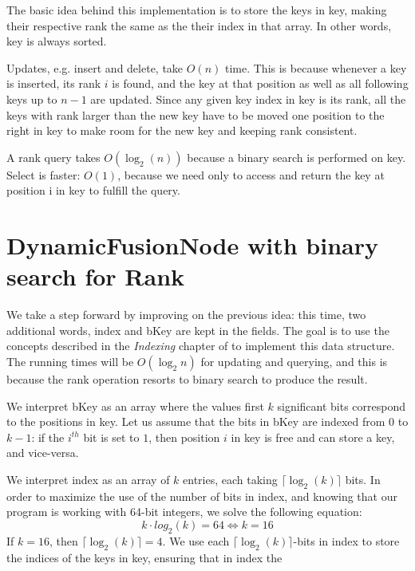 The basic idea behind this implementation is to store the keys in {\ttfamily key}, making their respective rank the same as the their index in that array. In other words, {\ttfamily key} is always sorted.

Updates, e.g. insert and delete, take $O(n)$ time. This is because whenever a key is inserted, its rank $i$ is found, and the key at that position as well as all following keys up to $n-1$ are updated. Since any given key index in {\ttfamily key} is its rank, all the keys with rank larger than the new key have to be moved one position to the right in {\ttfamily key} to make room for the new key and keeping rank consistent.

A rank query takes $O(\log_2(n))$ because a binary search is performed on {\ttfamily key}. Select is faster: $O(1)$, because we need only to access and return the key at position {\ttfamily i} in {\ttfamily key} to fulfill the query.

\section{DynamicFusionNode with binary search for Rank}
We take a step forward by improving on the previous idea: this time, two additional words, {\ttfamily index} and {\ttfamily bKey} are kept in the fields. The goal is to use the concepts described in the \textit{Indexing} chapter of \cite{patrascu2014dynamic} to implement this data structure. The running times will be $O(\log_2 n)$ for updating and querying, and this is because the {\ttfamily rank} operation resorts to binary search to produce the result.

We interpret {\ttfamily bKey} as an array where the values first $k$ significant bits correspond to the positions in {\ttfamily key}. Let us assume that the bits in {\ttfamily bKey} are indexed from $0$ to $k-1$: if the $i^{th}$ bit is set to $1$, then position $i$ in {\ttfamily key} is free and can store a key, and vice-versa.

We interpret {\ttfamily index} as an array of $k$ entries, each taking $\lceil \log_2(k) \rceil$ bits. In order to maximize the use of the number of bits in {\ttfamily index}, and knowing that our program is working with 64-bit integers, we solve the following equation:
\begin{equation}
    k \cdot log_2(k) = 64 \iff k = 16
\end{equation}
If $k=16$, then $\lceil \log_2(k) \rceil = 4$. We use each $\lceil \log_2(k) \rceil$-bits in {\ttfamily index} to store the indices of the keys in {\ttfamily key}, ensuring that in {\ttfamily index} the

